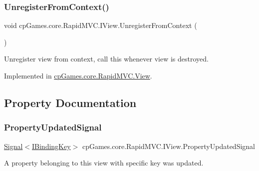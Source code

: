 \subsubsection{\texorpdfstring{UnregisterFromContext()}{UnregisterFromContext()}}
{\footnotesize\ttfamily void cp\+Games.\+core.\+Rapid\+M\+V\+C.\+I\+View.\+Unregister\+From\+Context (\begin{DoxyParamCaption}{ }\end{DoxyParamCaption})}



Unregister view from context, call this whenever view is destroyed. 



Implemented in \mbox{\hyperlink{classcp_games_1_1core_1_1_rapid_m_v_c_1_1_view_a4b7e26a0ea011dac7cf83be10645db4d}{cp\+Games.\+core.\+Rapid\+M\+V\+C.\+View}}.



\subsection{Property Documentation}
\mbox{\label{interfacecp_games_1_1core_1_1_rapid_m_v_c_1_1_i_view_ae21e2d124f1e977c79babb40c3e991e8}} 
\subsubsection{\texorpdfstring{PropertyUpdatedSignal}{PropertyUpdatedSignal}}
{\footnotesize\ttfamily \mbox{\hyperlink{classcp_games_1_1core_1_1_rapid_m_v_c_1_1_signal}{Signal}}$<$\mbox{\hyperlink{interfacecp_games_1_1core_1_1_rapid_m_v_c_1_1_i_binding_key}{I\+Binding\+Key}}$>$ cp\+Games.\+core.\+Rapid\+M\+V\+C.\+I\+View.\+Property\+Updated\+Signal\hspace{0.3cm}{\ttfamily [get]}}



A property belonging to this view with specific key was updated. 

\mbox{\label{interfacecp_games_1_1core_1_1_rapid_m_v_c_1_1_i_view_a5bd50e4d816c545fd092c59ed14fcbf0}} 
